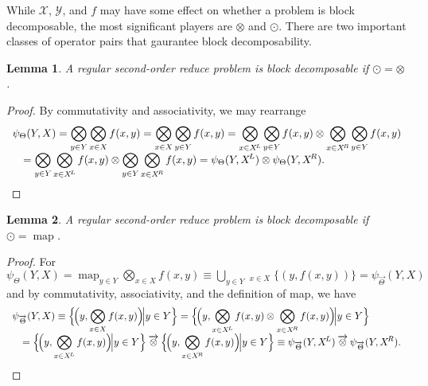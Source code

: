 \documentclass{article}
\newtheorem{lemma}{Lemma}
\newcommand{\GNP}[1][\psi]{{#1}_{\Theta}}
\newcommand{\GNPvec}[1][\psi]{{#1}_{\overrightarrow{\Theta}}}
\newcommand{\otimesvec}{\mathbin{\overrightarrow{\otimes}}}
\newcommand{\bigotimesvec}{\mathop{\overrightarrow{\bigotimes}}}
\DeclareMathOperator*{\map}{map}
\begin{document}
While $\mathcal{X}$, $\mathcal{Y}$, and $f$ may have some effect on
whether a problem is block decomposable, the most significant players
are $\otimes$ and $\odot$.  There are two important classes of
operator pairs that gaurantee block decomposability.
\begin{lemma}
  A regular second-order reduce problem is block decomposable if
  $\odot = \otimes$.
\end{lemma}
\begin{proof}
  By commutativity and associativity, we may rearrange
  \[ \begin{array}{ll}
    \multicolumn{2}{l}{\displaystyle \GNP(Y,X) = \bigotimes_{y \in Y} \bigotimes_{x \in X} f(x,y) = \bigotimes_{x \in X} \bigotimes_{y \in Y} f(x,y) = \bigotimes_{x \in X^{\!L}} \bigotimes_{y \in Y} f(x,y) \otimes \bigotimes_{x \in X^{\!R}} \bigotimes_{y \in Y} f(x,y)} \\
    & \displaystyle = \bigotimes_{y \in Y} \bigotimes_{x \in X^{\!L}} f(x,y) \otimes \bigotimes_{y \in Y} \bigotimes_{x \in X^{\!R}} f(x,y) = \GNP(Y,X^{\!L}) \otimes \GNP(Y,X^{\!R}).
  \end{array} \]
\end{proof}
\begin{lemma}\label{lem:map}
  A regular second-order reduce problem is block decomposable if
  $\odot = \map$.
\end{lemma}
\begin{proof}
  For $\GNP(Y,X) = \map_{y \in Y} \bigotimes_{x \in X} f(x,y) \equiv
  \bigcup_{y \in Y} \bigotimesvec_{x \in X} \{(y,f(x,y))\} =
  \GNPvec(Y,X)$ and by commutativity, associativity, and the
  definition of map, we have
  \[ \begin{array}{ll}
    \multicolumn{2}{l}{\displaystyle \GNPvec(Y,X) \equiv \Big\{ \!\Big( y,\bigotimes_{x \in X} f(x,y) \Big)\! \Big| y \in Y \Big\} = \Big\{ \!\Big( y,\bigotimes_{x \in X^{\!L}} f(x,y) \otimes \bigotimes_{x \in X^{\!R}} f(x,y) \Big)\! \Big| y \in Y \Big\}} \\
    & \displaystyle = \Big\{ \!\Big( y,\bigotimes_{x \in X^{\!L}} f(x,y) \Big)\! \Big| y \in Y \Big\} \otimesvec \Big\{ \!\Big( y,\bigotimes_{x \in X^{\!R}} f(x,y) \Big)\! \Big| y \in Y \Big\} \equiv \GNPvec(Y,X^{\!L}) \otimesvec \GNPvec(Y,X^{\!R}).
  \end{array} \]
\end{proof}

\end{document}
